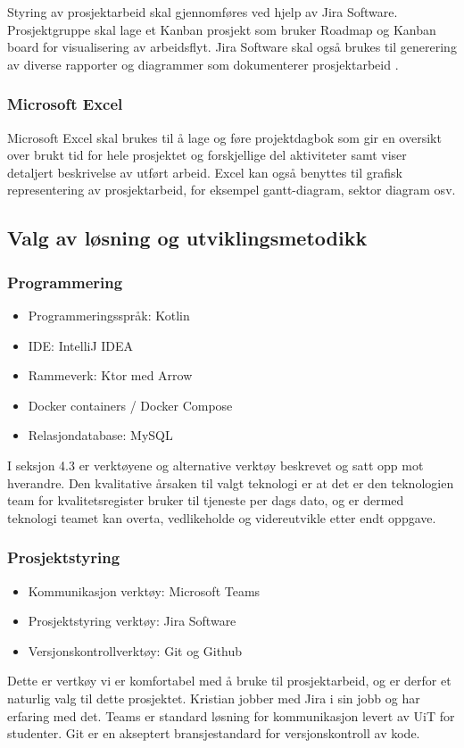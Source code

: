 Styring av prosjektarbeid skal gjennomføres ved hjelp av Jira Software. Prosjektgruppe skal lage et Kanban prosjekt som bruker Roadmap og Kanban board for visualisering av arbeidsflyt. Jira Software skal også brukes til generering av diverse rapporter og diagrammer som dokumenterer prosjektarbeid \cite{4-atlassian.com-jira}.

\subsubsection*{Microsoft Excel}

Microsoft Excel skal brukes til å lage og føre projektdagbok som gir en oversikt over brukt tid for hele prosjektet og forskjellige del aktiviteter samt viser detaljert beskrivelse av utført arbeid. Excel kan også benyttes til grafisk representering av prosjektarbeid, for eksempel gantt-diagram, sektor diagram osv.
\newpage
\subsection{Valg av løsning og utviklingsmetodikk}

\subsubsection*{Programmering}

\begin{itemize}
\item Programmeringsspråk: Kotlin
\item IDE: IntelliJ IDEA
\item Rammeverk: Ktor med Arrow
\item Docker containers / Docker Compose
\item Relasjondatabase: MySQL
\end{itemize}
I seksjon 4.3 er verktøyene og alternative verktøy beskrevet og satt opp mot hverandre. Den kvalitative årsaken til valgt teknologi er at det er den teknologien team for kvalitetsregister bruker til tjeneste per dags dato, og er dermed teknologi teamet kan overta, vedlikeholde og videreutvikle etter endt oppgave.

\subsubsection*{Prosjektstyring}

\begin{itemize}
\item Kommunikasjon verktøy: Microsoft Teams
\item Prosjektstyring verktøy: Jira Software
\item Versjonskontrollverktøy: Git og Github
\end{itemize}
Dette er vertkøy vi er komfortabel med å bruke til prosjektarbeid, og er derfor et naturlig valg til dette prosjektet. Kristian jobber med Jira i sin jobb og har erfaring med det. Teams er standard løsning for kommunikasjon levert av UiT for studenter. Git er en akseptert bransjestandard for versjonskontroll av kode.
